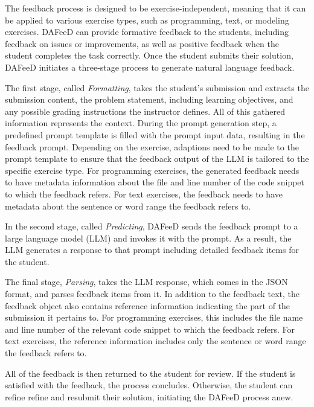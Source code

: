 \documentclass[manuscript,screen,review]{acmart}
\begin{document}
The feedback process is designed to be exercise-independent, meaning that it can be applied to various exercise types, such as programming, text, or modeling exercises.
DAFeeD can provide formative feedback to the students, including feedback on issues or improvements, as well as positive feedback when the student completes the task correctly.
Once the student submits their solution, DAFeeD initiates a three-stage process to generate natural language feedback.

The first stage, called \textit{Formatting}, takes the student's submission and extracts the submission content, the problem statement, including learning objectives, and any possible grading instructions the instructor defines.
All of this gathered information represents the context.
During the prompt generation step, a predefined prompt template is filled with the prompt input data, resulting in the feedback prompt.
Depending on the exercise, adaptions need to be made to the prompt template to ensure that the feedback output of the LLM is tailored to the specific exercise type.
For programming exercises, the generated feedback needs to have metadata information about the file and line number of the code snippet to which the feedback refers.
For text exercises, the feedback needs to have metadata about the sentence or word range the feedback refers to.

In the second stage, called \textit{Predicting}, DAFeeD sends the feedback prompt to a large language model (LLM) and invokes it with the prompt. 
As a result, the LLM generates a response to that prompt including detailed feedback items for the student.

The final stage, \textit{Parsing}, takes the LLM response, which comes in the JSON format, and parses feedback items from it. 
In addition to the feedback text, the feedback object also contains reference information indicating the part of the submission it pertains to.
For programming exercises, this includes the file name and line number of the relevant code snippet to which the feedback refers.
For text exercises, the reference information includes only the sentence or word range the feedback refers to.

All of the feedback is then returned to the student for review.
If the student is satisfied with the feedback, the process concludes. 
Otherwise, the student can refine refine and resubmit their solution, initiating the DAFeeD process anew.
\end{document}
